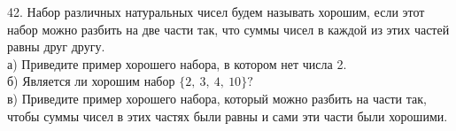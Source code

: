 42. Набор различных натуральных чисел будем называть хорошим, если этот набор можно разбить на две части так, что суммы чисел в каждой из этих частей равны друг другу.\\
а) Приведите пример хорошего набора, в котором нет числа 2.\\
б) Является ли хорошим набор $\{2,\ 3,\ 4,\ 10\}?$\\
в) Приведите пример хорошего набора, который можно разбить на части так, чтобы суммы чисел в этих частях были равны и сами эти части были хорошими.\\
